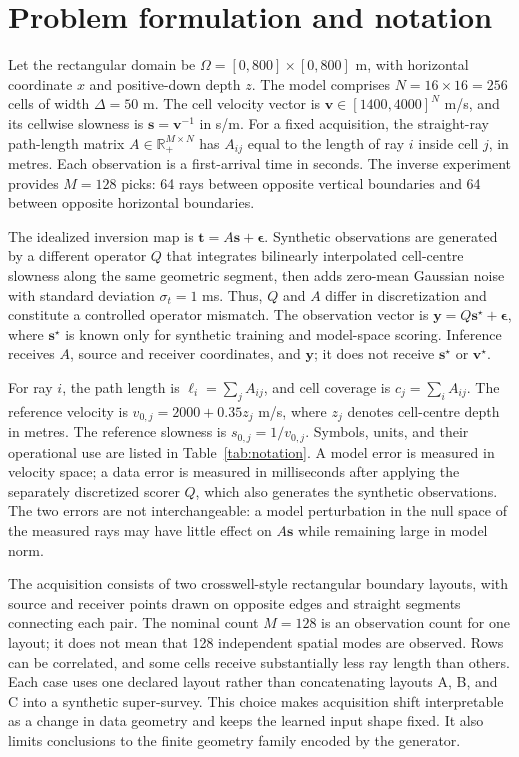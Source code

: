 \documentclass[11pt]{article}
\begin{document}
\section{Problem formulation and notation}
\label{sec:problem}
Let the rectangular domain be $\Omega=[0,800]\times[0,800]$ m, with horizontal coordinate $x$ and positive-down depth $z$. The model comprises $N=16\times16=256$ cells of width $\Delta=50$ m. The cell velocity vector is $\mathbf{v}\in[1400,4000]^N$ m/s, and its cellwise slowness is $\mathbf{s}=\mathbf{v}^{-1}$ in s/m. For a fixed acquisition, the straight-ray path-length matrix $A\in\mathbb{R}_{+}^{M\times N}$ has $A_{ij}$ equal to the length of ray $i$ inside cell $j$, in metres. Each observation is a first-arrival time in seconds. The inverse experiment provides $M=128$ picks: 64 rays between opposite vertical boundaries and 64 between opposite horizontal boundaries.

The idealized inversion map is $\mathbf{t}=A\mathbf{s}+\boldsymbol{\epsilon}$. Synthetic observations are generated by a different operator $Q$ that integrates bilinearly interpolated cell-centre slowness along the same geometric segment, then adds zero-mean Gaussian noise with standard deviation $\sigma_t=1$ ms. Thus, $Q$ and $A$ differ in discretization and constitute a controlled operator mismatch. The observation vector is $\mathbf{y}=Q\mathbf{s}^{\star}+\boldsymbol{\epsilon}$, where $\mathbf{s}^{\star}$ is known only for synthetic training and model-space scoring. Inference receives $A$, source and receiver coordinates, and $\mathbf{y}$; it does not receive $\mathbf{s}^{\star}$ or $\mathbf{v}^{\star}$.

For ray $i$, the path length is $\ell_i=\sum_j A_{ij}$, and cell coverage is $c_j=\sum_iA_{ij}$. The reference velocity is $v_{0,j}=2000+0.35z_j$ m/s, where $z_j$ denotes cell-centre depth in metres. The reference slowness is $s_{0,j}=1/v_{0,j}$. Symbols, units, and their operational use are listed in Table~\ref{tab:notation}. A model error is measured in velocity space; a data error is measured in milliseconds after applying the separately discretized scorer $Q$, which also generates the synthetic observations. The two errors are not interchangeable: a model perturbation in the null space of the measured rays may have little effect on $A\mathbf{s}$ while remaining large in model norm.

The acquisition consists of two crosswell-style rectangular boundary layouts, with source and receiver points drawn on opposite edges and straight segments connecting each pair. The nominal count $M=128$ is an observation count for one layout; it does not mean that 128 independent spatial modes are observed. Rows can be correlated, and some cells receive substantially less ray length than others. Each case uses one declared layout rather than concatenating layouts A, B, and C into a synthetic super-survey. This choice makes acquisition shift interpretable as a change in data geometry and keeps the learned input shape fixed. It also limits conclusions to the finite geometry family encoded by the generator.
\end{document}
